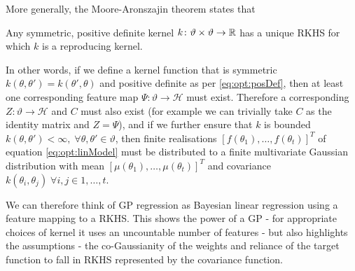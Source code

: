 More generally, the Moore-Aronszajin theorem \cite{aronszajn1950theory} states that
\begin{theorem}
	\label{the:opt:Moore-Aronszajin}
	Any symmetric, positive definite kernel $k \colon \vartheta \times \vartheta \rightarrow \mathbb{R}$ has a unique RKHS for which $k$ is a reproducing kernel.
\end{theorem}
In other words, if we define a kernel function that is symmetric $k\left(\theta,\theta'\right) = k\left(\theta',\theta\right)$ and positive definite as per \eqref{eq:opt:posDef}, then at least one corresponding feature map $\Psi \colon \vartheta \rightarrow \mathcal{H}$ must exist.  Therefore a corresponding $Z \colon \vartheta \rightarrow \mathcal{H}$ and $C$ must also exist (for example we can trivially take $C$ as the identity matrix and $Z = \Psi$), and if we further ensure that $k$ is bounded $k\left(\theta,\theta'\right) < \infty, \; \forall \theta, \theta' \in \vartheta$, then finite realisations  $\left[f\left(\theta_1\right),\dots,f\left(\theta_t\right)\right]^T$ of equation \eqref{eq:opt:linModel} must be distributed to a finite multivariate Gaussian distribution with mean  $\left[\mu\left(\theta_1\right),\dots,\mu\left(\theta_t\right)\right]^T$ and covariance $k\left(\theta_i,\theta_j\right) \; \forall i,j \in {1,\dots,t}$.  
%
%

We can therefore think of GP regression as Bayesian linear regression using
a feature mapping to a RKHS.  This shows the power of a GP - for appropriate
choices of kernel it uses an uncountable number of features - but also highlights
the assumptions - the co-Gaussianity of the weights and reliance of the target
function to fall in RKHS represented by the covariance function.